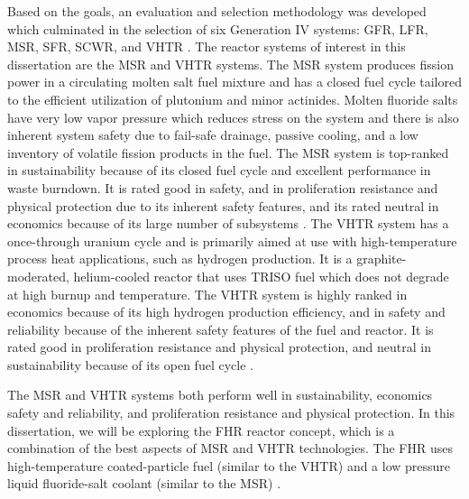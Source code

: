 Based on the goals, an evaluation and selection methodology was developed which 
culminated in the selection of six Generation IV systems: \gls{GFR}, 
\gls{LFR}, \gls{MSR}, \gls{SFR}, \gls{SCWR}, and \gls{VHTR} \cite{gif_technology_2002}. 
The reactor systems of interest in this dissertation are the \gls{MSR} and \gls{VHTR} systems. 
The \gls{MSR} system produces fission power in a circulating molten salt 
fuel mixture and has a closed fuel cycle tailored to the efficient 
utilization of plutonium and minor actinides. 
Molten fluoride salts have very low vapor pressure which reduces stress on the 
system and there is also inherent system safety due to fail-safe drainage, passive 
cooling, and a low inventory of volatile fission products in the fuel.  
The \gls{MSR} system is top-ranked in sustainability because of its closed 
fuel cycle and excellent performance in waste burndown. 
It is rated good in safety, and in proliferation resistance and physical 
protection due to its inherent safety features, and its rated neutral in economics 
because of its large number of subsystems \cite{gif_technology_2002}.  
The \gls{VHTR} system has a once-through uranium cycle and is primarily aimed 
at use with high-temperature process heat applications, such as hydrogen 
production. 
It is a graphite-moderated, helium-cooled reactor that uses \gls{TRISO} fuel 
which does not degrade at high burnup and temperature.  
The \gls{VHTR} system is highly ranked in economics because of its high hydrogen 
production efficiency, and in safety and reliability because of the inherent 
safety features of the fuel and reactor. 
It is rated good in proliferation resistance and physical protection, and 
neutral in sustainability because of its open fuel cycle \cite{gif_technology_2002}. 

The \gls{MSR} and \gls{VHTR} systems both perform well in sustainability, economics 
safety and reliability, and proliferation resistance and physical protection. 
In this dissertation, we will be exploring the \gls{FHR} reactor concept, which 
is a combination of the best aspects of \gls{MSR} and \gls{VHTR} technologies. 
The \gls{FHR} uses high-temperature coated-particle fuel (similar to the \gls{VHTR}) 
and a low pressure liquid fluoride-salt coolant (similar to the \gls{MSR})
\cite{forsberg_fluoride-salt-cooled_2012,facilitators_fluoride-salt-cooled_2013}.

